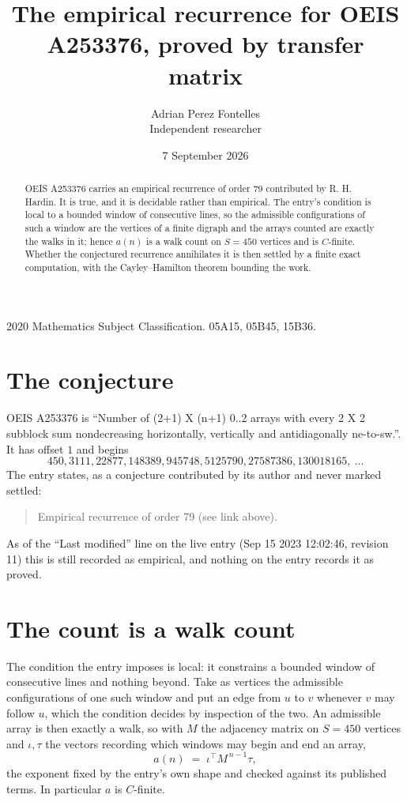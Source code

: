 \documentclass[11pt,a4paper]{article}
\title{The empirical recurrence for OEIS A253376, proved by transfer matrix}
\author{Adrian Perez Fontelles\\ \small Independent researcher}
\date{7 September 2026}
\theoremstyle{plain}
\theoremstyle{definition}
\begin{document}
\maketitle

\begin{abstract}
OEIS A253376 carries an empirical recurrence of order $79$ contributed by R. H. Hardin. It is
true, and it is decidable rather than empirical. The entry's condition is local to a bounded window of consecutive lines, so
the admissible configurations of such a window are the vertices of a finite digraph and the
arrays counted are exactly the walks in it; hence $a(n)$ is a walk count on $S=450$ vertices
and is $C$-finite. Whether the conjectured recurrence annihilates it is then settled by a
finite exact computation, with the Cayley--Hamilton theorem bounding the work.
\end{abstract}

\noindent\small 2020 Mathematics Subject Classification. 05A15, 05B45, 15B36.\normalsize

\section{The conjecture}

OEIS A253376 is ``Number of (2+1) X (n+1) 0..2 arrays with every 2 X 2 subblock sum nondecreasing horizontally, vertically and antidiagonally ne-to-sw.''. It has offset $1$ and begins
\[
450, 3111, 22877, 148389, 945748, 5125790, 27587386, 130018165,\ \dots
\]
The entry states, as a conjecture contributed by its author and never marked settled:
\begin{quote}
Empirical recurrence of order 79 (see link above).
\end{quote}
As of the ``Last modified'' line on the live entry (Sep 15 2023 12:02:46, revision 11) this is still
recorded as empirical, and nothing on the entry records it as proved.

\section{The count is a walk count}

The condition the entry imposes is local: it constrains a bounded window of consecutive lines and nothing beyond. Take as
vertices the admissible configurations of one such window and put an edge from $u$ to $v$
whenever $v$ may follow $u$, which the condition decides by inspection of the two. An
admissible array is then exactly a walk, so with $M$ the adjacency matrix on $S=450$ vertices
and $\iota,\tau$ the vectors recording which windows may begin and end an array,
\[
a(n)\;=\;\iota^{\!\top}M^{\,n-1}\tau ,
\]
the exponent fixed by the entry's own shape and checked against its published terms. In
particular $a$ is $C$-finite.
\end{document}
